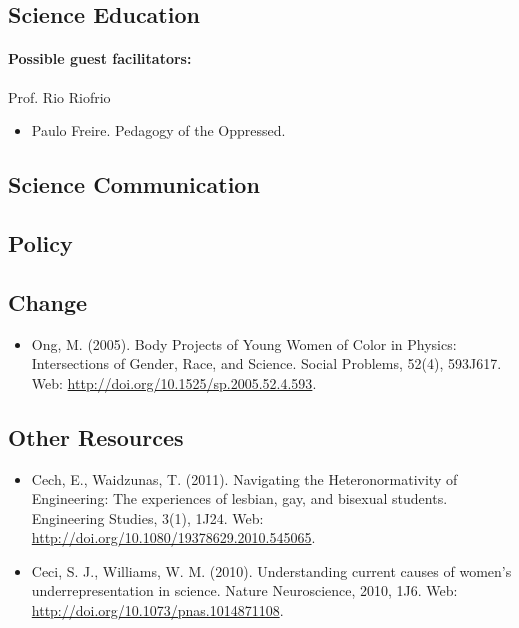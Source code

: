 \documentclass{article}
\begin{document}
\subsection{Science Education}
\paragraph{Possible guest facilitators:} Prof. Rio Riofrio
\begin{itemize}
\item Paulo Freire. Pedagogy of the Oppressed.
\end{itemize}

\subsection{Science Communication}

\subsection{Policy}

\subsection{Change}
\begin{itemize}
\item Ong, M. (2005). Body Projects of Young Women of Color in Physics: Intersections of Gender, Race, and Science. Social Problems, 52(4), 593J617. Web: \url{http://doi.org/10.1525/sp.2005.52.4.593}.
\end{itemize}

\subsection*{Other Resources}
\begin{itemize}
\item Cech, E., Waidzunas, T. (2011). Navigating the Heteronormativity of Engineering: The  experiences of lesbian, gay, and bisexual students. Engineering Studies, 3(1), 1J24. Web: \url{http://doi.org/10.1080/19378629.2010.545065}.
\item Ceci, S. J., Williams, W. M. (2010). Understanding current causes of women's  underrepresentation in science. Nature Neuroscience, 2010, 1J6. Web: \url{http://doi.org/10.1073/pnas.1014871108}.
\end{itemize}
\end{document}
